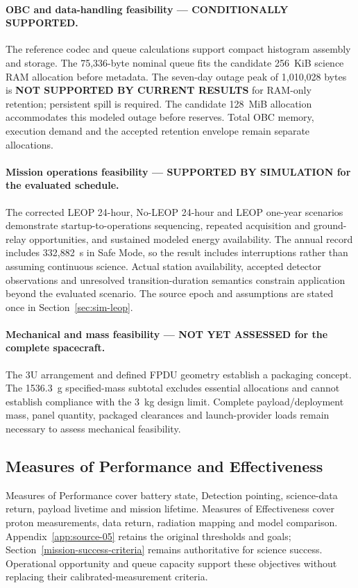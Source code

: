 \paragraph{OBC and data-handling feasibility --- CONDITIONALLY SUPPORTED.}
The reference codec and queue calculations support compact histogram assembly and storage. The 75,336-byte nominal queue fits the candidate 256~KiB science RAM allocation before metadata. The seven-day outage peak of 1,010,028 bytes is \textbf{NOT SUPPORTED BY CURRENT RESULTS} for RAM-only retention; persistent spill is required. The candidate 128~MiB allocation accommodates this modeled outage before reserves. Total OBC memory, execution demand and the accepted retention envelope remain separate allocations.

\paragraph{Mission operations feasibility --- SUPPORTED BY SIMULATION for the evaluated schedule.}
The corrected LEOP 24-hour, No-LEOP 24-hour and LEOP one-year scenarios demonstrate startup-to-operations sequencing, repeated acquisition and ground-relay opportunities, and sustained modeled energy availability. The annual record includes 332,882~s in Safe Mode, so the result includes interruptions rather than assuming continuous science. Actual station availability, accepted detector observations and unresolved transition-duration semantics constrain application beyond the evaluated scenario. The source epoch and assumptions are stated once in Section~\ref{sec:sim-leop}.

\paragraph{Mechanical and mass feasibility --- NOT YET ASSESSED for the complete spacecraft.}
The 3U arrangement and defined FPDU geometry establish a packaging concept. The 1536.3~g specified-mass subtotal excludes essential allocations and cannot establish compliance with the 3~kg design limit. Complete payload/deployment mass, panel quantity, packaged clearances and launch-provider loads remain necessary to assess mechanical feasibility.

\subsection{Measures of Performance and Effectiveness}\label{measures-of-performance-mops}
Measures of Performance cover battery state, Detection pointing, science-data return, payload livetime and mission lifetime. Measures of Effectiveness cover proton measurements, data return, radiation mapping and model comparison. Appendix~\ref{app:source-05} retains the original thresholds and goals; Section~\ref{mission-success-criteria} remains authoritative for science success. Operational opportunity and queue capacity support these objectives without replacing their calibrated-measurement criteria.

